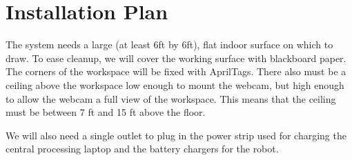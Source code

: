 
\section{Installation Plan}
\label{sec:installation_plan}
The system needs a large (at least 6ft by 6ft), flat indoor surface on which to draw. To ease cleanup, we will cover the working surface with blackboard paper. The corners of the workspace will be fixed with AprilTags. There also must be a ceiling above the workspace low enough to mount the webcam, but high enough to allow the webcam a full view of the workspace. This means that the ceiling must be between 7 ft and 15 ft above the floor.

We will also need a single outlet to plug in the power strip used for charging the central processing laptop and the battery chargers for the robot.
